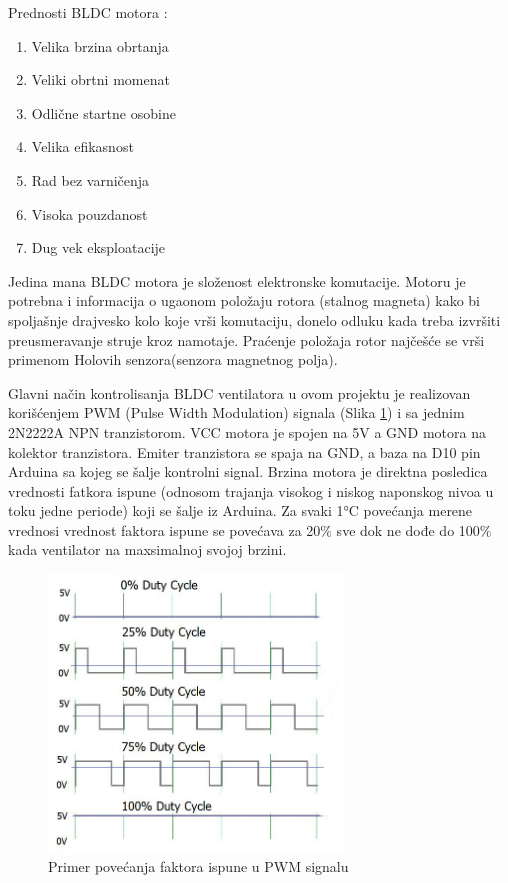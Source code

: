 \documentclass[a4paper, 12pt]{article}
\begin{document}
\vspace{10pt}

Prednosti BLDC motora : 
\begin{enumerate}
	\item Velika brzina obrtanja 
	\item Veliki obrtni momenat 
	\item Odlične startne osobine 
	\item Velika efikasnost 
	\item Rad bez varničenja  
	\item Visoka pouzdanost  
	\item Dug vek eksploatacije
\end{enumerate}
\endgroup
\pagebreak
Jedina mana BLDC motora je složenost elektronske komutacije. Motoru je potrebna i informacija o ugaonom položaju rotora (stalnog magneta) kako bi spoljašnje drajvesko kolo koje vrši komutaciju, donelo odluku kada treba izvršiti preusmeravanje struje kroz namotaje. Praćenje položaja rotor najčešće se vrši primenom Holovih senzora(senzora magnetnog polja).

\vspace{10pt}

Glavni način kontrolisanja BLDC ventilatora u ovom projektu je realizovan korišćenjem  PWM (Pulse Width Modulation) signala (Slika \ref{ref:pwm}) i sa jednim 2N2222A NPN tranzistorom. VCC motora je spojen na 5V a GND motora na kolektor tranzistora. Emiter tranzistora se spaja na GND, a baza na D10 pin Arduina sa kojeg se šalje kontrolni signal. Brzina motora je direktna posledica vrednosti fatkora ispune (odnosom trajanja visokog i niskog naponskog nivoa u toku jedne periode) koji se šalje iz Arduina. Za svaki 1°C povećanja merene vrednosi vrednost faktora ispune se povećava za 20\% sve dok ne dođe do 100\% kada ventilator na maxsimalnoj svojoj brzini. 

\vspace{10pt}

\begin{figure}[H]
\centering
	\includegraphics[width=0.7\textwidth]{images/pwm}
	\caption{Primer povećanja faktora ispune u PWM signalu} \label{ref:pwm}
\end{figure}
\pagebreak
\end{document}
